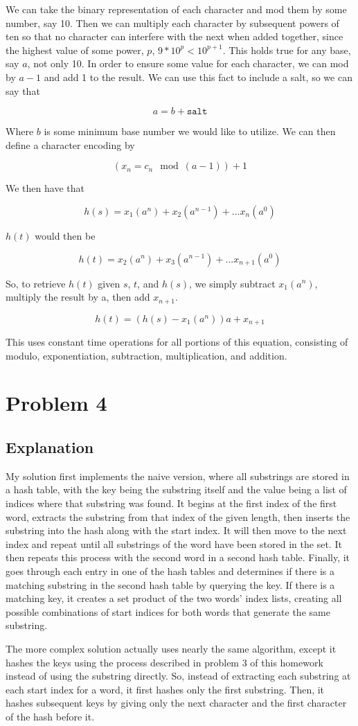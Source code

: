 \documentclass[answers, 12pt]{article}
\begin{document}
We can take the binary representation of each character and mod them by some number, say 10. Then we can multiply each character by subsequent powers of ten so that no character can interfere with the next when added together, since the highest value of some power, $p$, $9 * 10^p < 10^{p+1}$. This holds true for any base, say $a$, not only 10. In order to ensure some value for each character, we can mod by $a - 1$ and add 1 to the result. We can use this fact to include a salt, so we can say that 

\[
  a = b + \texttt{salt}
\]

Where $b$ is some minimum base number we would like to utilize. We can then define a character encoding by

\[
  (x_n = c_n \mod (a - 1)) + 1
\]

We then have that 

\[
  h(s) = x_1(a^n) + x_2(a^{n-1}) + ... x_n(a^0)
\] 

 $h(t)$ would then be 
 
 \[
  h(t) = x_2(a^{n}) + x_3(a^{n-1}) + ... x_{n+1}(a^0)
\]

So, to retrieve $h(t)$ given $s$, $t$, and $h(s)$, we simply subtract $x_1(a^n)$, multiply the result by a, then add $x_{n+1}$.

 \[
  h(t) = (h(s) - x_1(a^n))a + x_{n+1}
\]

This uses constant time operations for all portions of this equation, consisting of modulo, exponentiation, subtraction, multiplication, and addition.


\section*{Problem 4}
\subsection*{Explanation}
My solution first implements the naive version, where all substrings are stored in a hash table, with the key being the substring itself and the value being a list of indices where that substring was found. It begins at the first index of the first word, extracts the substring from that index of the given length, then inserts the substring into the hash along with the start index. It will then move to the next index and repeat until all substrings of the word have been stored in the set. It then repeats this process with the second word in a second hash table. Finally, it goes through each entry in one of the hash tables and determines if there is a matching substring in the second hash table by querying the key. If there is a matching key, it creates a set product of the two words' index lists, creating all possible combinations of start indices for both words that generate the same substring.

The more complex solution actually uses nearly the same algorithm, except it hashes the keys using the process described in problem 3 of this homework instead of using the substring directly. So, instead of extracting each substring at each start index for a word, it first hashes only the first substring. Then, it hashes subsequent keys by giving only the next character and the first character of the hash before it.
\end{document}
